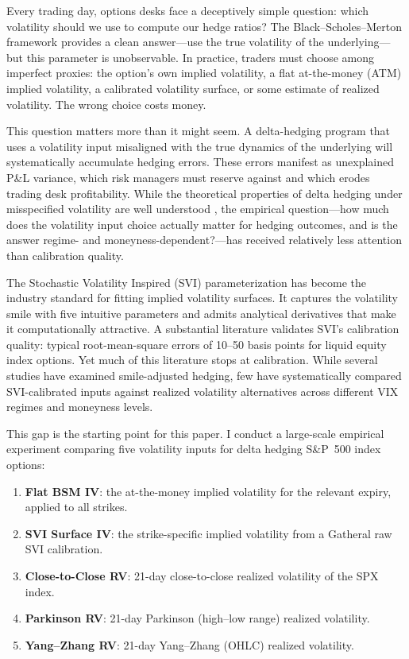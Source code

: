 \documentclass[12pt, letterpaper]{article}
\begin{document}
Every trading day, options desks face a deceptively simple question: which volatility should we use to compute our hedge ratios? The Black--Scholes--Merton framework \citep{Black1973, Merton1973} provides a clean answer---use the true volatility of the underlying---but this parameter is unobservable. In practice, traders must choose among imperfect proxies: the option's own implied volatility, a flat at-the-money (ATM) implied volatility, a calibrated volatility surface, or some estimate of realized volatility. The wrong choice costs money.

This question matters more than it might seem. A delta-hedging program that uses a volatility input misaligned with the true dynamics of the underlying will systematically accumulate hedging errors. These errors manifest as unexplained P\&L variance, which risk managers must reserve against and which erodes trading desk profitability. While the theoretical properties of delta hedging under misspecified volatility are well understood \citep{ElKaroui1998}, the empirical question---how much does the volatility input choice actually matter for hedging outcomes, and is the answer regime- and moneyness-dependent?---has received relatively less attention than calibration quality.

The Stochastic Volatility Inspired (SVI) parameterization \citep{Gatheral2004, Gatheral2014} has become the industry standard for fitting implied volatility surfaces. It captures the volatility smile with five intuitive parameters and admits analytical derivatives that make it computationally attractive. A substantial literature validates SVI's calibration quality: typical root-mean-square errors of 10--50 basis points for liquid equity index options. Yet much of this literature stops at calibration. While several studies have examined smile-adjusted hedging, few have systematically compared SVI-calibrated inputs against realized volatility alternatives across different VIX regimes and moneyness levels.

This gap is the starting point for this paper. I conduct a large-scale empirical experiment comparing five volatility inputs for delta hedging S\&P~500 index options:

\begin{enumerate}[label=(\arabic*)]
    \item \textbf{Flat BSM IV}: the at-the-money implied volatility for the relevant expiry, applied to all strikes.
    \item \textbf{SVI Surface IV}: the strike-specific implied volatility from a Gatheral raw SVI calibration.
    \item \textbf{Close-to-Close RV}: 21-day close-to-close realized volatility of the SPX index.
    \item \textbf{Parkinson RV}: 21-day Parkinson (high--low range) realized volatility.
    \item \textbf{Yang--Zhang RV}: 21-day Yang--Zhang (OHLC) realized volatility.
\end{enumerate}
\end{document}
